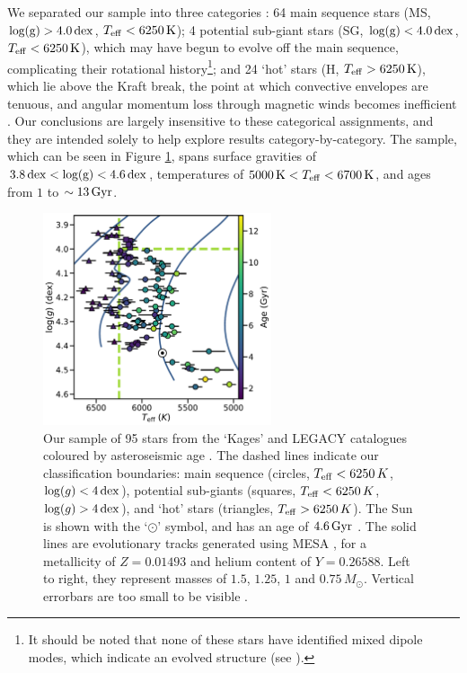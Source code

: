 \documentclass[12pt]{article}
\newcommand{\teff}{\mbox{$T_{\rm eff}$}\xspace}
\newcommand{\logg}{\mbox{$\log(g)$}\xspace}
\begin{document}
We separated our sample into three categories \cite{garcia+2014}: 64 main sequence stars (MS, $\rm{log(g)} > 4.0\, \rm dex$, $T_{\rm eff} < 6250\, \rm K$); 4 potential sub-giant stars (SG, $\rm{log(g)} < 4.0\, \rm dex$, $T_{\rm eff} < 6250\, \rm K$), which may have begun to evolve off the main sequence, complicating their rotational history\footnote{It should be noted that none of these stars have identified mixed dipole modes, which indicate an evolved structure (see \cite{bedding+2010}).}; and 24 `hot' stars (H, $T_{\rm eff} > 6250\, \rm K$), which lie above the Kraft break, the point at which convective envelopes are tenuous, and angular momentum loss through magnetic winds becomes inefficient \cite{kraft1967}. Our conclusions are largely insensitive to these categorical assignments, and they are intended solely to help explore results category-by-category. The sample, which can be seen in Figure \ref{fig:sample}, spans surface gravities of $3.8\, \rm{dex} < \rm{log(g)} < 4.6\, \rm{dex}$, temperatures of $5000\, \textrm{K} < T_{\rm eff} <  6700\, \rm{K}$, and ages from $1$ to $\sim 13\, \rm{Gyr}$.\\

\begin{figure}
	\centering
	\includegraphics[width=0.6\textwidth]{data.pdf}
	\caption{Our sample of 95 stars from the `Kages' and LEGACY catalogues coloured by asteroseismic age  \cite{silvaaguirre+2015, silvaaguirre+2017}. The dashed lines indicate our classification boundaries: main sequence (circles, $\teff < 6250\, K$, $\logg < 4\, \rm{dex}$), potential sub-giants (squares, $\teff < 6250\, K$, $\logg > 4\, \rm{dex}$), and `hot' stars (triangles, $\teff > 6250\, K$). The Sun is shown with the `$\odot$' symbol, and has an age of $4.6\, \rm{Gyr}$ \cite{bonanno+frohlich2015}. The solid lines are evolutionary tracks generated using MESA \cite{paxton+2017}, for a metallicity of $Z = 0.01493$ and helium content of $Y = 0.26588$. Left to right, they represent masses of $1.5$, $1.25$, $1$ and $0.75\, M_\odot$. Vertical errorbars are too small to be visible \cite{hunter2007}.}
	\label{fig:sample}
\end{figure}
\end{document}
